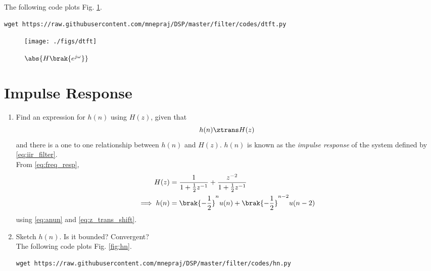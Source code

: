 \documentclass[journal,12pt,twocolumn]{IEEEtran}
\renewcommand\thesection{\arabic{section}}
\begin{document}
\begin{enumerate}[label=\thesection.\arabic*]
	      The following code plots Fig. \ref{fig:dtft}.
	      \begin{lstlisting}
wget https://raw.githubusercontent.com/mnepraj/DSP/master/filter/codes/dtft.py
\end{lstlisting}
	      \begin{figure}[!ht]
		      \centering
		      \texttt{[image: ./figs/dtft]}
		      \caption{$\abs{H\brak{e^{j\omega}}}$}
		      \label{fig:dtft}
	      \end{figure}
\end{enumerate}

\section{Impulse Response}
\begin{enumerate}[label=\thesection.\arabic*]
	\item \label{prob:impulse_resp}
	      Find an expression for $h(n)$ using $H(z)$, given that
	      \begin{equation}
		      \label{eq:impulse_resp}
		      h(n) \ztrans H(z)
	      \end{equation}
	      and there is a one to one relationship between $h(n)$ and $H(z)$. $h(n)$ is known as the {\em impulse response} of the
	      system defined by \eqref{eq:iir_filter}.
	      \\
	      \solution From \eqref{eq:freq_resp},
	      \begin{align}
		      H(z)          & = \frac{1}{1 + \frac{1}{2}z^{-1}} + \frac{ z^{-2}}{1 + \frac{1}{2}z^{-1}}
		      \\
		      \implies h(n) & = \brak{-\frac{1}{2}}^{n}u(n) + \brak{-\frac{1}{2}}^{n-2}u(n-2)
	      \end{align}
	      using \eqref{eq:anun} and \eqref{eq:z_trans_shift}.
	\item Sketch $h(n)$. Is it bounded? Convergent?
	      \\
	      \solution The following code plots Fig. \ref{fig:hn}.
	      \begin{lstlisting}
wget https://raw.githubusercontent.com/mnepraj/DSP/master/filter/codes/hn.py
\end{lstlisting}
	      \begin{figure}[!ht]
		      \centering

\end{figure}
\end{enumerate}
\end{document}
